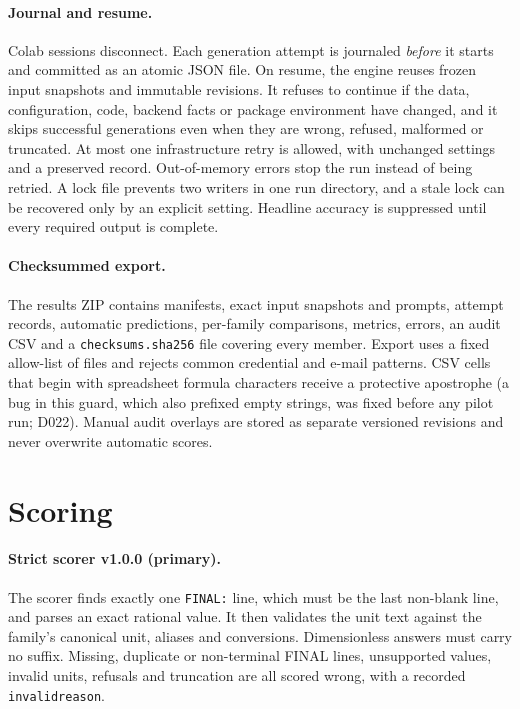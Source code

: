 \documentclass[12pt,a4paper,oneside]{report}
\renewcommand{\_}{\oldunderscore\allowbreak}
\begin{document}
\paragraph{Journal and resume.} Colab sessions disconnect. Each generation attempt is journaled \emph{before} it starts and committed as an atomic JSON file. On resume, the engine reuses frozen input snapshots and immutable revisions. It refuses to continue if the data, configuration, code, backend facts or package environment have changed, and it skips successful generations even when they are wrong, refused, malformed or truncated. At most one infrastructure retry is allowed, with unchanged settings and a preserved record. Out-of-memory errors stop the run instead of being retried. A lock file prevents two writers in one run directory, and a stale lock can be recovered only by an explicit setting. Headline accuracy is suppressed until every required output is complete.

\paragraph{Checksummed export.} The results ZIP contains manifests, exact input snapshots and prompts, attempt records, automatic predictions, per-family comparisons, metrics, errors, an audit CSV and a \texttt{checksums.sha256} file covering every member. Export uses a fixed allow-list of files and rejects common credential and e-mail patterns. CSV cells that begin with spreadsheet formula characters receive a protective apostrophe (a bug in this guard, which also prefixed empty strings, was fixed before any pilot run; D022). Manual audit overlays are stored as separate versioned revisions and never overwrite automatic scores.

\section{Scoring}

\paragraph{Strict scorer v1.0.0 (primary).} The scorer finds exactly one \texttt{FINAL:} line, which must be the last non-blank line, and parses an exact rational value. It then validates the unit text against the family's canonical unit, aliases and conversions. Dimensionless answers must carry no suffix. Missing, duplicate or non-terminal FINAL lines, unsupported values, invalid units, refusals and truncation are all scored wrong, with a recorded \texttt{invalid\_reason}.
\end{document}
